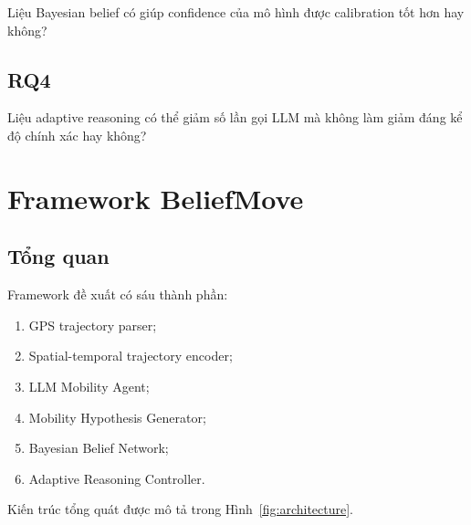 \documentclass[11pt,a4paper]{article}
\begin{document}
	Liệu Bayesian belief có giúp confidence của mô hình được calibration
	tốt hơn hay không?
	
	\subsection{RQ4}
	
	Liệu adaptive reasoning có thể giảm số lần gọi LLM mà không làm giảm
	đáng kể độ chính xác hay không?
	
	\section{Framework BeliefMove}
	
	\subsection{Tổng quan}
	
	Framework đề xuất có sáu thành phần:
	
	\begin{enumerate}
		\item GPS trajectory parser;
		\item Spatial-temporal trajectory encoder;
		\item LLM Mobility Agent;
		\item Mobility Hypothesis Generator;
		\item Bayesian Belief Network;
		\item Adaptive Reasoning Controller.
	\end{enumerate}
	
	Kiến trúc tổng quát được mô tả trong Hình~\ref{fig:architecture}.
	
\end{document}
